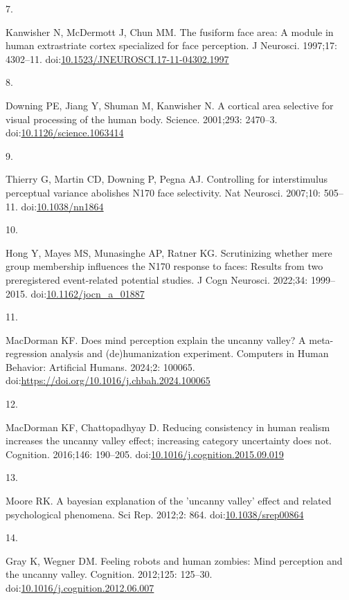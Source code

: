 \documentclass[
]{article}
\newlength{\cslhangindent}
\newlength{\csllabelwidth}
\newenvironment{CSLReferences}[2] %
 {\begin{list}{}{%
  \setlength{\itemindent}{0pt}
  \setlength{\leftmargin}{0pt}
  \setlength{\parsep}{0pt}
  \ifodd #1
   \setlength{\leftmargin}{\cslhangindent}
   \setlength{\itemindent}{-1\cslhangindent}
  \fi
  \setlength{\itemsep}{#2\baselineskip}}}
 {\end{list}}
\newcommand{\CSLLeftMargin}[1]{\parbox[t]{\csllabelwidth}{\strut#1\strut}}
\newcommand{\CSLRightInline}[1]{\parbox[t]{\linewidth - \csllabelwidth}{\strut#1\strut}}
\begin{document}
\begin{CSLReferences}{0}{1}
\CSLLeftMargin{7. }%
\CSLRightInline{Kanwisher N, McDermott J, Chun MM. The fusiform face area: A module in human extrastriate cortex specialized for face perception. J Neurosci. 1997;17: 4302--11. doi:\href{https://doi.org/10.1523/JNEUROSCI.17-11-04302.1997}{10.1523/JNEUROSCI.17-11-04302.1997}}

\CSLLeftMargin{8. }%
\CSLRightInline{Downing PE, Jiang Y, Shuman M, Kanwisher N. A cortical area selective for visual processing of the human body. Science. 2001;293: 2470--3. doi:\href{https://doi.org/10.1126/science.1063414}{10.1126/science.1063414}}

\CSLLeftMargin{9. }%
\CSLRightInline{Thierry G, Martin CD, Downing P, Pegna AJ. Controlling for interstimulus perceptual variance abolishes N170 face selectivity. Nat Neurosci. 2007;10: 505--11. doi:\href{https://doi.org/10.1038/nn1864}{10.1038/nn1864}}

\CSLLeftMargin{10. }%
\CSLRightInline{Hong Y, Mayes MS, Munasinghe AP, Ratner KG. Scrutinizing whether mere group membership influences the N170 response to faces: Results from two preregistered event-related potential studies. J Cogn Neurosci. 2022;34: 1999--2015. doi:\href{https://doi.org/10.1162/jocn_a_01887}{10.1162/jocn\_a\_01887}}

\CSLLeftMargin{11. }%
\CSLRightInline{MacDorman KF. Does mind perception explain the uncanny valley? A meta-regression analysis and (de)humanization experiment. Computers in Human Behavior: Artificial Humans. 2024;2: 100065. doi:\url{https://doi.org/10.1016/j.chbah.2024.100065}}

\CSLLeftMargin{12. }%
\CSLRightInline{MacDorman KF, Chattopadhyay D. Reducing consistency in human realism increases the uncanny valley effect; increasing category uncertainty does not. Cognition. 2016;146: 190--205. doi:\href{https://doi.org/10.1016/j.cognition.2015.09.019}{10.1016/j.cognition.2015.09.019}}

\CSLLeftMargin{13. }%
\CSLRightInline{Moore RK. A bayesian explanation of the 'uncanny valley' effect and related psychological phenomena. Sci Rep. 2012;2: 864. doi:\href{https://doi.org/10.1038/srep00864}{10.1038/srep00864}}

\CSLLeftMargin{14. }%
\CSLRightInline{Gray K, Wegner DM. Feeling robots and human zombies: Mind perception and the uncanny valley. Cognition. 2012;125: 125--30. doi:\href{https://doi.org/10.1016/j.cognition.2012.06.007}{10.1016/j.cognition.2012.06.007}}


\end{CSLReferences}
\end{document}
